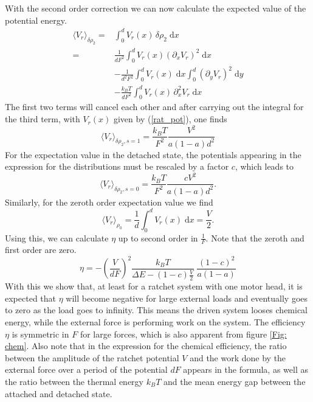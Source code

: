 \documentclass[aps,pre,twocolumn,showpacs,showkeys,a4paper]{revtex4}
\newcommand{\rmd}{{\mathrm d}}
\begin{document}
With the second order correction we can now calculate the expected value of the potential energy.
\begin{align*}
\langle V_r \rangle_{\delta\rho_2} 
=& \int_0^d V_r(x) \, \delta\rho_2 \; \rmd x \\
=& \frac{1}{d F^2} \int_0^d V_r(x) \left(\partial_x V_r \right)^2 \; \rmd x  \\
&- \frac{1}{d^2 F^2} \int_0^d V_r(x) \; \rmd x \int_0^d \left( \partial_y V_r \right)^2 \; \rmd y \\
&- \frac{k_B T}{d F^2} \int_0^d V_r(x) \, \partial_x^2 V_r \; \rmd x
\end{align*}
The first two terms will cancel each other and after carrying out the integral for the third term, with $V_r(x)$ given by (\ref{rat_pot}), one finds 
\begin{equation}
\langle V_r \rangle_{ \delta\rho_2, s=1} = \frac{k_B T}{F^2} \frac{V^2}{a \left(1-a\right) d^2 }
\end{equation}
For the expectation value in the detached state, the potentials appearing in the expression for the distributions must be rescaled by a factor $c$, which leads to
\begin{equation}
\langle V_r \rangle_{\delta\rho_2, s=0} = \frac{k_B T}{F^2} \frac{c V^2}{a \left(1-a\right) d^2 } .
\end{equation}
Similarly, for the zeroth order expectation value we find
\begin{equation}
\langle V_r \rangle_{\rho_0} = \frac{1}{d} \int_0^d V_r(x) \; \rmd x = \frac{V}{2} .
\end{equation}
Using this, we can calculate $\eta$ up to second order in $\frac{1}{F}$. 
Note that the zeroth and first order are zero.
\begin{equation}
\eta = -\left( \frac{V}{d F} \right)^2 \frac{k_B T} { \Delta E - (1-c) \frac{V}{2} } \; \frac{ \left(1-c\right)^2 }{ a (1-a) }
\end{equation}
With this we show that, at least for a ratchet system with one motor head, it is expected that $\eta$ will become negative for large external loads and eventually goes to zero as the load goes to infinity. 
This means the driven system looses chemical energy, while the external force is performing work on the system. 
The efficiency $\eta$ is symmetric in $F$ for large forces, which is also apparent from figure \ref{Fig: chem}. 
Also note that in the expression for the chemical efficiency, the ratio between the amplitude of the ratchet potential $V$ and the work done by the external force over a period of the potential $d F$ appears in the formula, as well as the ratio between the thermal energy $k_B T$ and the mean energy gap between the attached and detached state. 
\end{document}
